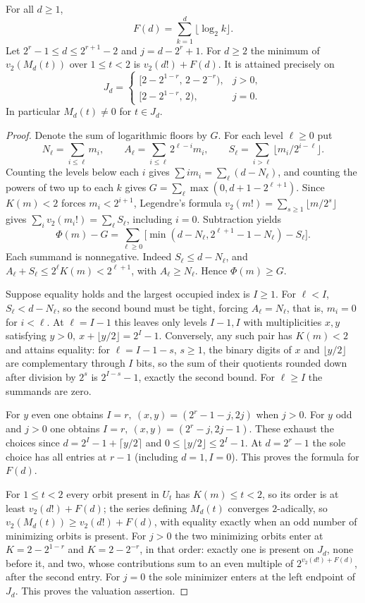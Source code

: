 \documentclass[11pt]{article}
\begin{document}
\begin{theorem}\label{least}
For all \(d\ge1\),
\[
 F(d)=\sum_{k=1}^d\lfloor\log_2 k\rfloor .
\]
Let \(2^r-1\le d\le2^{r+1}-2\) and \(j=d-2^r+1\).
For \(d\ge2\) the minimum of \(v_2(M_d(t))\) over \(1\le t<2\) is
\(v_2(d!)+F(d)\). It is attained precisely on
\[
 J_d=
 \begin{cases}
 [2-2^{1-r},\,2-2^{-r}),& j>0,\\
 [2-2^{1-r},\,2),&j=0.
 \end{cases}
\]
In particular \(M_d(t)\ne0\) for \(t\in J_d\). 
\end{theorem}
\begin{proof}
Denote the sum of logarithmic floors by \(G\). For each level \(\ell\ge0\) put
\[
 N_\ell=\sum_{i\le \ell}m_i,\qquad A_\ell=\sum_{i\le \ell}2^{\ell-i}m_i,\qquad
 S_\ell=\sum_{i>\ell}\lfloor m_i/2^{i-\ell}\rfloor .
\]
Counting the levels below each \(i\) gives
\(\sum i m_i=\sum_\ell(d-N_\ell)\), and counting the powers of two up to
each \(k\) gives \(G=\sum_\ell\max(0,d+1-2^{\ell+1})\).
Since \(K(m)<2\) forces \(m_i<2^{i+1}\), Legendre's formula
\(v_2(m!)=\sum_{s\ge1}\lfloor m/2^s\rfloor\) gives
\(\sum_i v_2(m_i!)=\sum_\ell S_\ell\), including \(i=0\). Subtraction yields
\[
 \Phi(m)-G=\sum_{\ell\ge0}
 \bigl[\min(d-N_\ell,2^{\ell+1}-1-N_\ell)-S_\ell\bigr].
\]
Each summand is nonnegative. Indeed \(S_\ell\le d-N_\ell\), and
\(A_\ell+S_\ell\le 2^\ell K(m)<2^{\ell+1}\), with \(A_\ell\ge N_\ell\).
Hence \(\Phi(m)\ge G\).

Suppose equality holds and the largest occupied index is \(I\ge1\).
For \(\ell<I\), \(S_\ell<d-N_\ell\), so the second bound must be tight,
forcing \(A_\ell=N_\ell\), that is, \(m_i=0\) for \(i<\ell\). At
\(\ell=I-1\) this leaves only levels \(I-1,I\) with multiplicities \(x,y\)
satisfying \(y>0,\ x+\lfloor y/2\rfloor=2^I-1\). Conversely, any such
pair has \(K(m)<2\) and attains equality: for \(\ell=I-1-s\), \(s\ge1\),
the binary digits of \(x\) and \(\lfloor y/2\rfloor\) are complementary
through \(I\) bits, so the sum of their quotients rounded down after
division by \(2^s\) is \(2^{I-s}-1\), exactly the second bound. For
\(\ell\ge I\) the summands are zero.

For \(y\) even one obtains \(I=r,\ (x,y)=(2^r-1-j,2j)\) when \(j>0\).
For \(y\) odd and \(j>0\) one obtains
\(I=r,\ (x,y)=(2^r-j,2j-1)\). These exhaust the choices since
\(d=2^I-1+\lceil y/2\rceil\) and \(0\le\lfloor y/2\rfloor\le2^I-1\).
At \(d=2^r-1\) the sole choice has all entries at \(r-1\)
(including \(d=1,I=0\)). This proves the formula for \(F(d)\).

For \(1\le t<2\) every orbit present in \(U_t\) has \(K(m)\le t<2\), so
its order is at least \(v_2(d!)+F(d)\); the series defining \(M_d(t)\)
converges \(2\)-adically, so \(v_2(M_d(t))\ge v_2(d!)+F(d)\), with equality
exactly when an odd number of minimizing orbits is present. For \(j>0\)
the two minimizing orbits enter at \(K=2-2^{1-r}\) and \(K=2-2^{-r}\), in
that order: exactly one is present on \(J_d\), none before it, and two,
whose contributions sum to an even multiple of \(2^{v_2(d!)+F(d)}\), after
the second entry. For \(j=0\) the sole minimizer enters at the left
endpoint of \(J_d\). This proves the valuation assertion.
\end{proof}
\end{document}
